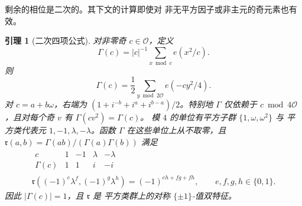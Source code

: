 \documentclass[11pt,a4paper]{article}
\numberwithin{equation}{section}
\numberwithin{figure}{section}
\newtheorem{lemma}[theorem]{引理}
\theoremstyle{definition}
\theoremstyle{remark}
\begin{document}
剩余的相位是二次的。其下文的计算即使对
非无平方因子或非主元的奇元素也有效。

\begin{lemma}[二次四项公式]\label{lem:quadratic-four-term}
对非零奇 $c\in\mathcal O$，定义
\[
 \Gamma(c)=|c|^{-1}\sum_{x\bmod c}e(x^2/c).
\]
则
\begin{equation}\label{eq:quadratic-four-term}
 \Gamma(c)=\frac12\sum_{y\bmod2\mathcal O}e(-cy^2/4).
\end{equation}
对 $c=a+b\omega$，右端为
$(1+i^{-b}+i^a+i^{b-a})/2$。特别地 $\Gamma$ 仅依赖于
$c\bmod4\mathcal O$，且对每个奇 $v$ 有 $\Gamma(cv^2)=\Gamma(c)$。
模 $4$ 的单位有平方子群 $\{1,\omega,\omega^2\}$ 与
平方类代表元 $1,-1,\lambda,-\lambda$。函数
$\Gamma$ 在这些单位上从不取零，且
$\mathfrak r(a,b)=\Gamma(ab)/(\Gamma(a)\Gamma(b))$ 满足
\begin{equation}\label{eq:reciprocity-four-class}
 \begin{gathered}
 \begin{array}{c|rrrr}
  c&1&-1&\lambda&-\lambda\\ \hline
  \Gamma(c)&1&1&i&-i
 \end{array}\\
 \mathfrak r((-1)^e\lambda^f,(-1)^g\lambda^h)
       =(-1)^{eh+fg+fh},\qquad e,f,g,h\in\{0,1\}.
 \end{gathered}
\end{equation}
因此 $|\Gamma(c)|=1$，且 $\mathfrak r$ 是
平方类群上的对称 $\{\pm1\}$-值双特征。
\end{lemma}
\end{document}
